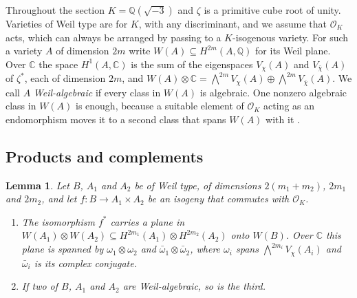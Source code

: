 \documentclass[11pt]{amsart}
\newtheorem{lemma}[theorem]{Lemma}
\theoremstyle{definition}
\theoremstyle{remark}
\newcommand{\QQ}{\mathbb{Q}}
\newcommand{\CC}{\mathbb{C}}
\newcommand{\cO}{\mathcal{O}}
\begin{document}
Throughout the section $K=\QQ(\sqrt{-3})$ and $\zeta$ is a primitive cube
root of unity. Varieties of Weil type are for $K$, with any discriminant,
and we assume that $\cO_{K}$ acts, which can always be arranged by passing
to a $K$-isogenous variety. For such a variety $A$ of dimension $2m$ write
$W(A)\subseteq H^{2m}(A,\QQ)$ for its Weil plane. Over $\CC$ the space
$H^{1}(A,\CC)$ is the sum of the eigenspaces $V_{\chi}(A)$ and
$V_{\bar\chi}(A)$ of $\zeta^{*}$, each of dimension $2m$, and
$W(A)\otimes\CC=\bigwedge^{2m}V_{\chi}(A)\oplus\bigwedge^{2m}V_{\bar\chi}(A)$.
We call $A$ \emph{Weil-algebraic} if every class in $W(A)$ is algebraic. One
nonzero algebraic class in $W(A)$ is enough, because a suitable element of
$\cO_{K}$ acting as an endomorphism moves it to a second class that spans
$W(A)$ with it \cite[proof of Theorem~6]{BhW}.

\subsection{Products and complements}

\begin{lemma}\label{lem:twothree}
Let $B$, $A_{1}$ and $A_{2}$ be of Weil type, of dimensions
$2(m_{1}+m_{2})$, $2m_{1}$ and $2m_{2}$, and let $f\colon B\to A_{1}\times
A_{2}$ be an isogeny that commutes with $\cO_{K}$.
\begin{enumerate}[label=(\alph*)]
\item The isomorphism $f^{*}$ carries a plane in
$W(A_{1})\otimes W(A_{2})\subseteq H^{2m_{1}}(A_{1})\otimes H^{2m_{2}}(A_{2})$
onto $W(B)$. Over $\CC$ this plane is spanned by $\omega_{1}\otimes\omega_{2}$
and $\bar\omega_{1}\otimes\bar\omega_{2}$, where $\omega_{i}$ spans
$\bigwedge^{2m_{i}}V_{\chi}(A_{i})$ and $\bar\omega_{i}$ is its complex
conjugate.
\item If two of $B$, $A_{1}$ and $A_{2}$ are Weil-algebraic, so is the third.
\end{enumerate}
\end{lemma}
\end{document}
